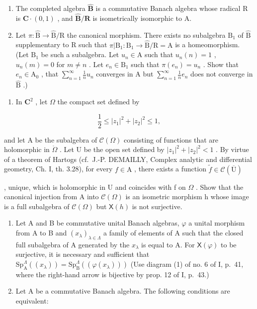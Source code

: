 \begin{enumerate}
\def\labelenumi{\alph{enumi})}
\item
  The completed algebra \(\widehat{\mathbf{B}}\) is a commutative Banach algebra whose radical R is \(\mathbf{C} \cdot (0,1)\) , and \(\widehat{\mathbf{B}}/\mathbf{R}\) is isometrically isomorphic to A.
\item
  Let \(\pi\colon\widehat{\mathrm{B}}\to\widehat{\mathrm{B}}/\mathrm{R}\) the canonical morphism. There exists no subalgebra \(\mathrm{B}_{1}\) of \(\widehat{\mathrm{B}}\) supplementary to R such that \(\pi|\mathrm{B}_{1}\colon\mathrm{B}_{1}\to\widehat{\mathrm{B}}/\mathrm{R}=\mathrm{A}\) is a homeomorphism. (Let \(\mathrm{B}_{1}\) be such a subalgebra. Let \(u_{n}\in\mathrm{A}\) such that \(u_{n}(n)=1\) , \(u_{n}(m)=0\) for \(m\neq n\) . Let \(e_{n}\in\mathrm{B}_{1}\) such that \(\pi(e_{n})=u_{n}\) . Show that \(e_{n}\in\mathrm{A}_{0}\) , that \(\sum_{n=1}^{\infty}\frac{1}{n}u_{n}\) converges in A but \(\sum_{n=1}^{\infty}\frac{1}{n}e_{n}\) does not converge in \(\widehat{\mathrm{B}}\) .)
\end{enumerate}

\begin{enumerate}
\def\labelenumi{\arabic{enumi})}
\setcounter{enumi}{13}
\tightlist
\item
  In \(\mathbf{C}^2\) , let \(\Omega\) the compact set defined by
\end{enumerate}

\[
\frac {1}{2} \leqslant | z _ {1} | ^ {2} + | z _ {2} | ^ {2} \leqslant 1,
\]

and let A be the subalgebra of \(\mathcal{C}(\Omega)\) consisting of functions that are holomorphic in \(\mathring{\Omega}\) . Let U be the open set defined by \(|z_1|^2 + |z_2|^2 < 1\) . By virtue of a theorem of Hartogs (cf.~J.-P. DEMAILLY, Complex analytic and differential geometry, Ch. I, th. 3.28), for every \(f \in \mathrm{A}\) , there exists a function \(\widetilde{f} \in \mathcal{C}(\overline{\mathrm{U}})\)

, unique, which is holomorphic in U and coincides with f on \(\Omega\) . Show that the canonical injection from A into \(\mathcal{C}(\Omega)\) is an isometric morphism h whose image is a full subalgebra of \(\mathcal{C}(\Omega)\) but \(\mathsf{X}(h)\) is not surjective.

\begin{enumerate}
\def\labelenumi{\arabic{enumi})}
\setcounter{enumi}{14}
\item
  Let A and B be commutative unital Banach algebras, \(\varphi\) a unital morphism from A to B and \((x_{\lambda})_{\lambda \in \Lambda}\) a family of elements of A such that the closed full subalgebra of A generated by the \(x_{\lambda}\) is equal to A. For \(\mathsf{X}(\varphi)\) to be surjective, it is necessary and sufficient that \(\mathrm{Sp}_{\mathrm{A}}^{\Lambda}((x_{\lambda})) = \mathrm{Sp}_{\mathrm{B}}^{\Lambda}((\varphi (x_{\lambda})))\) (Use diagram (1) of no. 6 of I, p.~41, where the right-hand arrow is bijective by prop. 12 of I, p.~43.)
\item
  Let A be a commutative Banach algebra. The following conditions are equivalent:
\end{enumerate}


